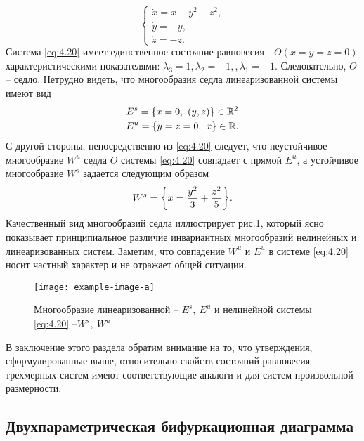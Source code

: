 \begin{equation}
        \label{eq:4.20}
        \begin{cases}
                \dot x = x - y^2 - z^2, \\
                \dot y = - y, \\
                \dot z = - z.
        \end{cases}
\end{equation}
Система \eqref{eq:4.20} имеет единственное состояние равновесия - $O(x=y=z=0)$  характеристическими показателями: $\lambda_3=1, \lambda_2=-1,, \lambda_1=-1$. Следовательно, $O$ -- седло. Нетрудно видеть, что многообразия седла линеаризованной системы имеют вид
\begin{gather}
        E^s = \qty{ x=0, ~ (y,z)} \in \mathbb{R}^2\\
                E^{u} = \qty{ y =z =0 ,~ x} \in \mathbb{R}.
\end{gather}
С другой стороны, непосредственно из \eqref{eq:4.20} следует, что неустойчивое многообразие $W^u$ седла $O$ системы \eqref{eq:4.20} совпадает с прямой $E^u$, а устойчивое многообразие $W^s$ задается следующим образом
\begin{equation}
        \label{eq:}
        W^s = \qty{ x = \frac{y^2}{3} + \frac{z^2}{5} }.
\end{equation}
Качественный вид многообразий седла иллюстрирует рис.\ref{fig:4.6}, который ясно показывает принципиальное 
различие инвариантных многообразий нелинейных и линеаризованных систем. Заметим, что совпадение $W^u$ и $E^u$ в системе \eqref{eq:4.20} носит частный характер и не отражает общей ситуации. 

\begin{figure}[h!]
        \centering
        \texttt{[image: example-image-a]}
        \caption{Многообразие линеаризованной -- $E^s,~E^u$ и нелинейной системы \eqref{eq:4.20} --$W^s,~ W^u$.}
        \label{fig:4.6}
\end{figure}

В заключение этого раздела обратим внимание на то, что утверждения, сформулированные выше, относительно свойств состояний равновесия трехмерных систем имеют соответствующие аналоги и для систем произвольной размерности.

\subsection{Двухпараметрическая бифуркационная диаграмма}%
\label{sub:4.4.4}

